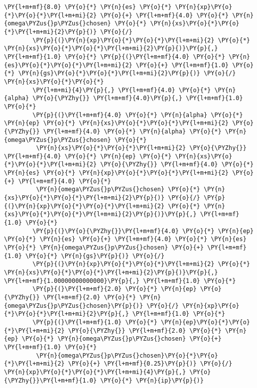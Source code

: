 \begin{Verbatim}[commandchars=\\\{\}]
         \PY{l+m+mf}{8.0} \PY{o}{*} \PY{n}{es} \PY{o}{*} \PY{n}{xp}\PY{o}{*}\PY{o}{*}\PY{l+m+mi}{2} \PY{o}{+} \PY{l+m+mf}{4.0} \PY{o}{*} \PY{n}{omega\PYZus{}p\PYZus{}chosen} \PY{o}{*} \PY{n}{xs}\PY{o}{*}\PY{o}{*}\PY{l+m+mi}{2}\PY{p}{)} \PY{o}{/}
        \PY{p}{(}\PY{n}{xp}\PY{o}{*}\PY{o}{*}\PY{l+m+mi}{2} \PY{o}{*} \PY{n}{xs}\PY{o}{*}\PY{o}{*}\PY{l+m+mi}{2}\PY{p}{)}\PY{p}{,} \PY{l+m+mf}{1.0} \PY{o}{*} \PY{p}{(}\PY{l+m+mf}{4.0} \PY{o}{*} \PY{n}{es}\PY{o}{*}\PY{o}{*}\PY{l+m+mi}{2} \PY{o}{+} \PY{l+m+mf}{1.0} \PY{o}{*} \PY{n}{gs}\PY{o}{*}\PY{o}{*}\PY{l+m+mi}{2}\PY{p}{)} \PY{o}{/} \PY{n}{xs}\PY{o}{*}\PY{o}{*}
        \PY{l+m+mi}{4}\PY{p}{,} \PY{l+m+mf}{4.0} \PY{o}{*} \PY{n}{alpha} \PY{o}{\PYZhy{}} \PY{l+m+mf}{4.0}\PY{p}{,} \PY{l+m+mf}{1.0} \PY{o}{*}
        \PY{p}{(}\PY{l+m+mf}{4.0} \PY{o}{*} \PY{n}{alpha} \PY{o}{*} \PY{n}{ep} \PY{o}{*} \PY{n}{xs}\PY{o}{*}\PY{o}{*}\PY{l+m+mi}{2} \PY{o}{\PYZhy{}} \PY{l+m+mf}{4.0} \PY{o}{*} \PY{n}{alpha} \PY{o}{*} \PY{n}{omega\PYZus{}p\PYZus{}chosen} \PY{o}{*}
         \PY{n}{xs}\PY{o}{*}\PY{o}{*}\PY{l+m+mi}{2} \PY{o}{\PYZhy{}} \PY{l+m+mf}{4.0} \PY{o}{*} \PY{n}{ep} \PY{o}{*} \PY{n}{xs}\PY{o}{*}\PY{o}{*}\PY{l+m+mi}{2} \PY{o}{\PYZhy{}} \PY{l+m+mf}{4.0} \PY{o}{*} \PY{n}{es} \PY{o}{*} \PY{n}{xp}\PY{o}{*}\PY{o}{*}\PY{l+m+mi}{2} \PY{o}{+} \PY{l+m+mf}{4.0} \PY{o}{*}
         \PY{n}{omega\PYZus{}p\PYZus{}chosen} \PY{o}{*} \PY{n}{xs}\PY{o}{*}\PY{o}{*}\PY{l+m+mi}{2}\PY{p}{)} \PY{o}{/} \PY{p}{(}\PY{n}{xp}\PY{o}{*}\PY{o}{*}\PY{l+m+mi}{2} \PY{o}{*} \PY{n}{xs}\PY{o}{*}\PY{o}{*}\PY{l+m+mi}{2}\PY{p}{)}\PY{p}{,} \PY{l+m+mf}{1.0} \PY{o}{*}
        \PY{p}{(}\PY{o}{\PYZhy{}}\PY{l+m+mf}{4.0} \PY{o}{*} \PY{n}{ep} \PY{o}{*} \PY{n}{es} \PY{o}{+} \PY{l+m+mf}{4.0} \PY{o}{*} \PY{n}{es} \PY{o}{*} \PY{n}{omega\PYZus{}p\PYZus{}chosen} \PY{o}{+} \PY{l+m+mf}{1.0} \PY{o}{*} \PY{n}{gs}\PY{p}{)} \PY{o}{/}
        \PY{p}{(}\PY{n}{xp}\PY{o}{*}\PY{o}{*}\PY{l+m+mi}{2} \PY{o}{*} \PY{n}{xs}\PY{o}{*}\PY{o}{*}\PY{l+m+mi}{2}\PY{p}{)}\PY{p}{,} \PY{l+m+mf}{1.00000000000000}\PY{p}{,} \PY{l+m+mf}{1.0} \PY{o}{*}
        \PY{p}{(}\PY{l+m+mf}{2.0} \PY{o}{*} \PY{n}{ep} \PY{o}{\PYZhy{}} \PY{l+m+mf}{2.0} \PY{o}{*} \PY{n}{omega\PYZus{}p\PYZus{}chosen}\PY{p}{)} \PY{o}{/} \PY{n}{xp}\PY{o}{*}\PY{o}{*}\PY{l+m+mi}{2}\PY{p}{,} \PY{l+m+mf}{1.0} \PY{o}{*}
        \PY{p}{(}\PY{l+m+mf}{1.0} \PY{o}{*} \PY{n}{ep}\PY{o}{*}\PY{o}{*}\PY{l+m+mi}{2} \PY{o}{\PYZhy{}} \PY{l+m+mf}{2.0} \PY{o}{*} \PY{n}{ep} \PY{o}{*} \PY{n}{omega\PYZus{}p\PYZus{}chosen} \PY{o}{+} \PY{l+m+mf}{1.0} \PY{o}{*}
         \PY{n}{omega\PYZus{}p\PYZus{}chosen}\PY{o}{*}\PY{o}{*}\PY{l+m+mi}{2} \PY{o}{+} \PY{l+m+mf}{0.25}\PY{p}{)} \PY{o}{/} \PY{n}{xp}\PY{o}{*}\PY{o}{*}\PY{l+m+mi}{4}\PY{p}{,} \PY{o}{\PYZhy{}}\PY{l+m+mf}{1.0} \PY{o}{*} \PY{n}{ip}\PY{p}{)}

\end{Verbatim}
